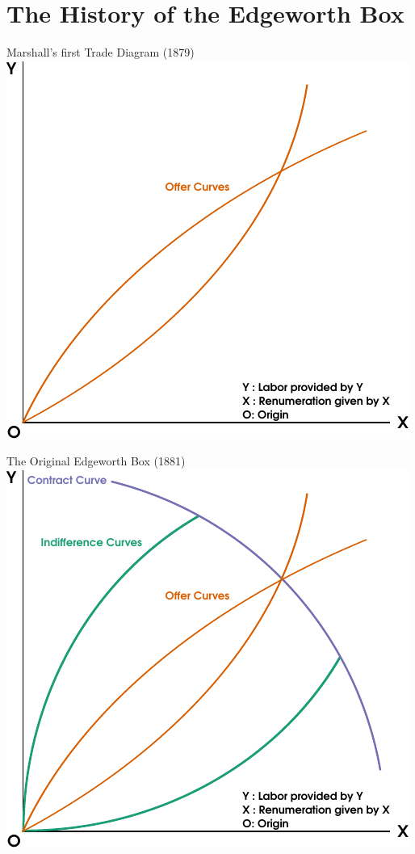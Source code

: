 \documentclass[ucs]{beamer}\usepackage[]{graphicx}\usepackage[]{color}
\begin{document}
\section{The History of the Edgeworth Box}
\begin{frame}{Marshall's  first Trade Diagram (1879)}
\includegraphics[scale = 0.9]{Marshall.pdf}
\end{frame}

\begin{frame}{The Original Edgeworth Box (1881)}
\includegraphics[scale = 0.9]{EdgeworthBox.pdf}
\end{frame}
\end{document}
